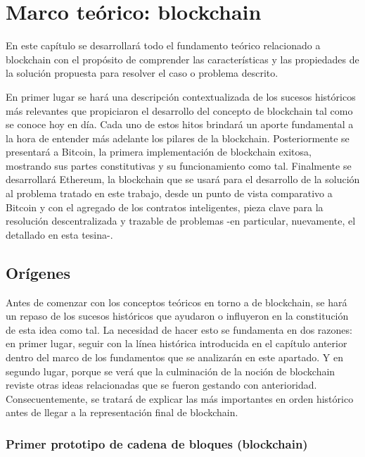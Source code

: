 \section{Marco teórico: blockchain}
\label{mt_blockchain}

En este capítulo se desarrollará todo el fundamento teórico relacionado a blockchain con el propósito de comprender las características y las propiedades de la solución propuesta para resolver el caso o problema descrito.

En primer lugar se hará una descripción contextualizada de los sucesos históricos más relevantes que propiciaron el desarrollo del concepto de blockchain tal como se conoce hoy en día. Cada uno de estos hitos brindará un aporte fundamental a la hora de entender más adelante los pilares de la blockchain. Posteriormente se presentará a Bitcoin, la primera implementación de blockchain exitosa, mostrando sus partes constitutivas y su funcionamiento como tal. Finalmente se desarrollará Ethereum, la blockchain que se usará para el desarrollo de la solución al problema tratado en este trabajo, desde un punto de vista comparativo a Bitcoin y con el agregado de los contratos inteligentes, pieza clave para la resolución descentralizada y trazable de problemas -en particular, nuevamente, el detallado en esta tesina-.

\subsection{Orígenes}

Antes de comenzar con los conceptos teóricos en torno a de blockchain, se hará un repaso de los sucesos históricos que ayudaron o influyeron en la constitución de esta idea como tal. La necesidad de hacer esto se fundamenta en dos razones: en primer lugar, seguir con la línea histórica introducida en el capítulo anterior dentro del marco de los fundamentos que se analizarán en este apartado. Y en segundo lugar, porque se verá que la culminación de la noción de blockchain reviste otras ideas relacionadas que se fueron gestando con anterioridad. Consecuentemente, se tratará de explicar las más importantes en orden histórico antes de llegar a la representación final de blockchain.

\subsubsection{Primer prototipo de cadena de bloques (blockchain)}
\label{bc_origins_blockchain}

